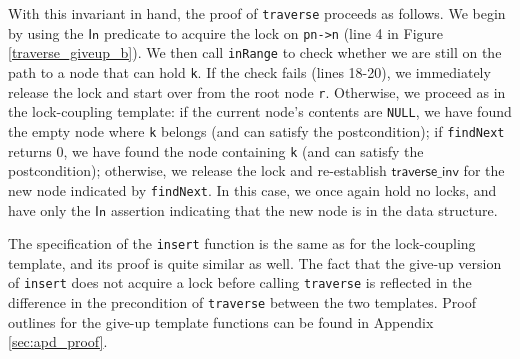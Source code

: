 \documentclass[sigplan,screen]{acmart}
\newcommand{\inFP}{\ensuremath{\mathsf{In }}}
\begin{document}
{With this invariant in hand, the proof of \texttt{traverse} proceeds as follows. We begin by using the $\inFP$ predicate to acquire the lock on \lstinline{pn->n} (line 4 in Figure \ref{traverse_giveup_b}). We then call \lstinline{inRange} to check whether we are still on the path to a node that can hold \lstinline{k}. If the check fails (lines 18-20), we immediately release the lock and start over from the root node \texttt{r}. Otherwise, we proceed as in the lock-coupling template: if the current node's contents are \texttt{NULL}, we have found the empty node where \texttt{k} belongs (and can satisfy the postcondition); if \texttt{findNext} returns 0, we have found the node containing \texttt{k} (and can satisfy the postcondition); otherwise, we release the lock and re-establish $\mathsf{traverse\_inv}$ for the new node indicated by \texttt{findNext}. In this case, we once again hold no locks, and have only the $\inFP$ assertion indicating that the new node is in the data structure. %


The specification of the \lstinline{insert} function is the same as for the lock-coupling template, and its proof is quite similar as well. The fact that the give-up version of \lstinline{insert} does not acquire a lock before calling \lstinline{traverse} is reflected in the difference in the precondition of \lstinline{traverse} between the two templates. Proof outlines for the give-up template functions can be found in Appendix \ref{sec:apd_proof}.

}
\end{document}
